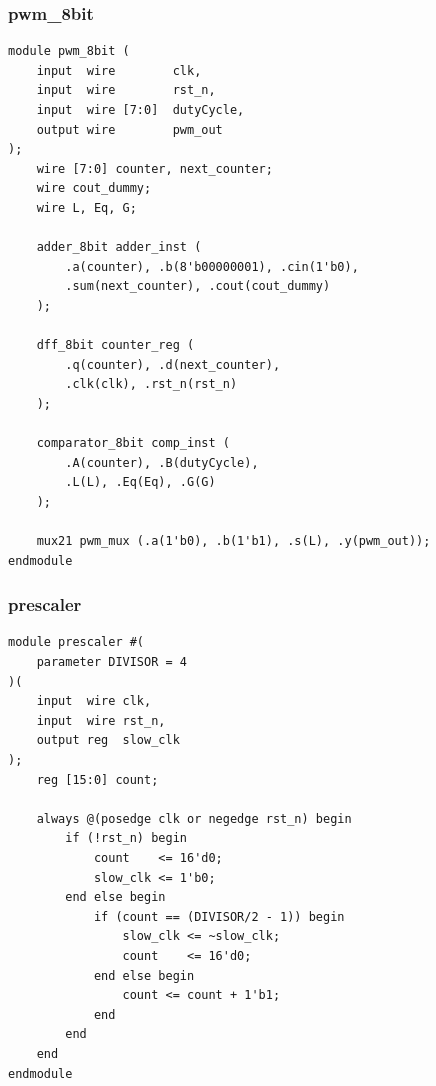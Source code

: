 \documentclass[12pt,a4paper]{article}
\begin{document}
\subsubsection*{pwm\_8bit}
\begin{lstlisting}
module pwm_8bit (
    input  wire        clk,
    input  wire        rst_n,
    input  wire [7:0]  dutyCycle,
    output wire        pwm_out
);
    wire [7:0] counter, next_counter;
    wire cout_dummy;
    wire L, Eq, G;

    adder_8bit adder_inst (
        .a(counter), .b(8'b00000001), .cin(1'b0),
        .sum(next_counter), .cout(cout_dummy)
    );

    dff_8bit counter_reg (
        .q(counter), .d(next_counter),
        .clk(clk), .rst_n(rst_n)
    );

    comparator_8bit comp_inst (
        .A(counter), .B(dutyCycle),
        .L(L), .Eq(Eq), .G(G)
    );

    mux21 pwm_mux (.a(1'b0), .b(1'b1), .s(L), .y(pwm_out));
endmodule
\end{lstlisting}

\subsubsection*{prescaler}
\begin{lstlisting}
module prescaler #(
    parameter DIVISOR = 4
)(
    input  wire clk,
    input  wire rst_n,
    output reg  slow_clk
);
    reg [15:0] count;

    always @(posedge clk or negedge rst_n) begin
        if (!rst_n) begin
            count    <= 16'd0;
            slow_clk <= 1'b0;
        end else begin
            if (count == (DIVISOR/2 - 1)) begin
                slow_clk <= ~slow_clk;
                count    <= 16'd0;
            end else begin
                count <= count + 1'b1;
            end
        end
    end
endmodule
\end{lstlisting}
\end{document}
